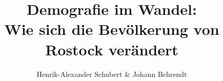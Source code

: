 \documentclass[aspectratio=169]{beamer}
\begin{document}
\title[Theile]									
{Demografie im Wandel: \\
\small Wie sich die Bev\"olkerung von Rostock verändert}
\author[Theile]{Henrik-Alexander Schubert \& Johann Behrendt}



\begin{frame}[mpidrbackground=1]
  \titlepage
\end{frame}


%
%
%
\end{document}
